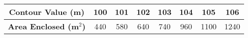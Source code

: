 \begin{table}[h!]
\centering
\begin{tabular}{|c|c|c|c|c|c|c|c|}
\hline
\textbf{Contour Value (m)} & 100 & 101 & 102 & 103 & 104 & 105 & 106 \\
\hline
\textbf{Area Enclosed (m$^2$)} & 440 & 580 & 640 & 740 & 960 & 1100 & 1240 \\
\hline
\end{tabular}
\end{table}